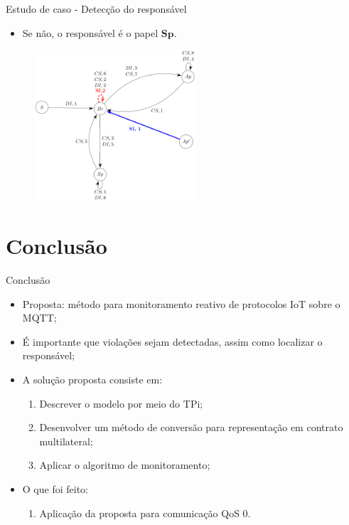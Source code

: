 \documentclass[12pt,xcolor={usenames,dvipsnames}]{beamer}
\begin{document}
\begin{frame}{Estudo de caso - Detecção do responsável}
\begin{itemize}
	\item Se não, o responsável é o papel $\textbf{Sp}$.  
\end{itemize}
\begin{figure}[ht]
	\centering
	\includegraphics[width=6cm]{./figuras/grafo_final.png}
\end{figure}
\end{frame}

\section{Conclusão}
\begin{frame}{Conclusão}
\begin{itemize}
	\item Proposta: método para monitoramento reativo de protocolos IoT sobre o MQTT;
	\item É importante que violações sejam detectadas, assim como localizar o responsável;
	\item A solução proposta consiste em:
		\begin{enumerate}
			\item Descrever o modelo por meio do TPi;
			\item Desenvolver um método de conversão para representação em contrato multilateral;
			\item Aplicar o algoritmo de monitoramento;
		\end{enumerate}
	\item O que foi feito: 
		\begin{enumerate}
			\item Aplicação da proposta para comunicação QoS 0.
		\end{enumerate}
\end{itemize}
\end{frame}
\end{document}
